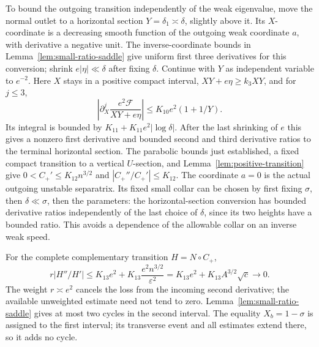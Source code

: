 To bound the outgoing transition independently of the weak eigenvalue,
move the normal outlet to a horizontal section
$Y=\delta_1\asymp\delta$, slightly above it.  Its $X$-coordinate is
a decreasing smooth function of the outgoing weak coordinate $a$,
with derivative a negative unit.
The inverse-coordinate bounds in
Lemma~\ref{lem:small-ratio-saddle} give uniform first three derivatives
for this conversion; shrink $e|\eta|\ll\delta$ after fixing $\delta$.
Continue with $Y$ as independent variable to $e^{-2}$.
Here $X$ stays in a positive compact interval,
$XY+e\eta\ge k_3XY$, and for $j\le3$,
\[
 \left|\partial_X^j
 \frac{e^2\mathcal F}{XY+e\eta}\right|
                         \le K_{10}e^2(1+1/Y).
\]
Its integral is bounded by
$K_{11}+K_{11}e^2|\log\delta|$.
After the last shrinking of $e$ this gives a nonzero first derivative
and bounded second and third derivative ratios to the terminal
horizontal section.
The parabolic bounds just established, a fixed compact transition to
a vertical $U$-section, and
Lemma~\ref{lem:positive-transition} give
$0<C_+'\le K_{12}n^{3/2}$ and
$|C_+''/C_+'|\le K_{12}$.
The coordinate $a=0$ is the actual outgoing unstable separatrix.
Its fixed small collar can be chosen by first fixing $\sigma$, then
$\delta\ll\sigma$, then the parameters: the horizontal-section
conversion has bounded derivative ratios independently of the last
choice of $\delta$, since its two heights have a bounded ratio.
This avoids a dependence of the allowable collar on an inverse weak
speed.

For the complete complementary transition $H=N\circ C_+$,
\begin{equation}\label{eq:simple-weighted-curvature}
 r|H''/H'|
 \le K_{13}e^2+
      K_{13}\frac{e^2n^{3/2}}{\varepsilon^2}
 =K_{13}e^2+K_{13}A^{3/2}\sqrt c\longrightarrow0.
\end{equation}
The weight $r\asymp e^2$ cancels the loss from the incoming second
derivative; the available unweighted estimate need not tend to zero.
Lemma~\ref{lem:small-ratio-saddle} gives at most two cycles in the
second interval.
The equality $X_b=1-\sigma$ is assigned to the first interval; its
transverse event and all estimates extend there, so it adds no cycle.

